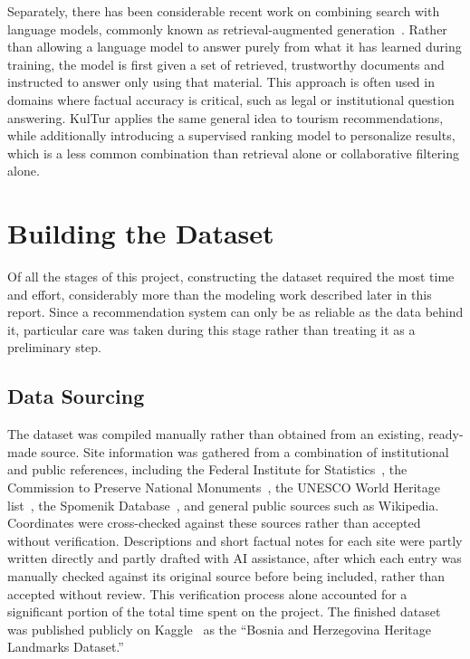 \documentclass[conference]{IEEEtran}
\begin{document}
Separately, there has been considerable recent work on combining search with language models, commonly known as retrieval-augmented generation~\cite{rag}. Rather than allowing a language model to answer purely from what it has learned during training, the model is first given a set of retrieved, trustworthy documents and instructed to answer only using that material. This approach is often used in domains where factual accuracy is critical, such as legal or institutional question answering. KulTur applies the same general idea to tourism recommendations, while additionally introducing a supervised ranking model to personalize results, which is a less common combination than retrieval alone or collaborative filtering alone.

\section{Building the Dataset}
Of all the stages of this project, constructing the dataset required the most time and effort, considerably more than the modeling work described later in this report. Since a recommendation system can only be as reliable as the data behind it, particular care was taken during this stage rather than treating it as a preliminary step.

\subsection{Data Sourcing}
The dataset was compiled manually rather than obtained from an existing, ready-made source. Site information was gathered from a combination of institutional and public references, including the Federal Institute for Statistics~\cite{fzs}, the Commission to Preserve National Monuments~\cite{kons}, the UNESCO World Heritage list~\cite{unesco}, the Spomenik Database~\cite{spomenik}, and general public sources such as Wikipedia. Coordinates were cross-checked against these sources rather than accepted without verification. Descriptions and short factual notes for each site were partly written directly and partly drafted with AI assistance, after which each entry was manually checked against its original source before being included, rather than accepted without review. This verification process alone accounted for a significant portion of the total time spent on the project. The finished dataset was published publicly on Kaggle~\cite{kaggle} as the ``Bosnia and Herzegovina Heritage Landmarks Dataset.''
\end{document}

